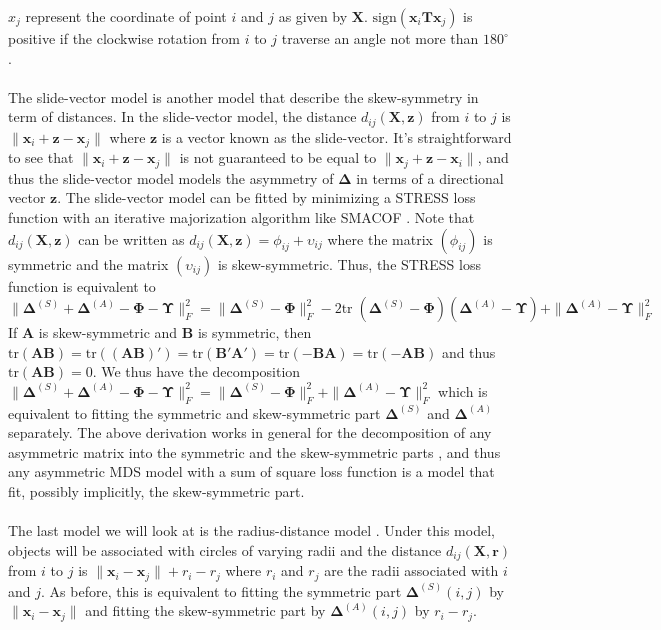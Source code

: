 \documentclass[11pt]{asaproc}
\begin{document}
$x_j$ represent the coordinate of point $i$ and $j$ as given by
$\mathbf{X}$. $\mathrm{sign}(\mathbf{x}_i \mathbf{T}
\mathbf{x}_j)$ is positive if the clockwise rotation from $i$ to $j$
traverse an angle not more than $180^\circ$. \\ \\
%
\noindent The slide-vector model is another model that describe the
skew-symmetry in term of distances. In the slide-vector model, the
distance $d_{ij}(\mathbf{X}, \mathbf{z})$ from $i$ to $j$ is 
$\| \mathbf{x}_i + \mathbf{z} - \mathbf{x}_j \|$ where $\mathbf{z}$
is a vector known as the slide-vector. It's straightforward to see that
$\| \mathbf{x}_i + \mathbf{z} - \mathbf{x}_j \|$ is not guaranteed to
be equal to $\| \mathbf{x}_j + \mathbf{z} - \mathbf{x}_i\|$, and thus
the slide-vector model models the asymmetry of $\bm{\Delta}$ in terms
of a directional vector $\mathbf{z}$. The slide-vector model can be
fitted by minimizing a STRESS loss function with an iterative
majorization algorithm like
SMACOF \citep{zielmand93:_analy}. Note that $d_{ij}(\mathbf{X},
\mathbf{z})$ can be written as $d_{ij}(\mathbf{X}, \mathbf{z}) =
\phi_{ij} + \upsilon_{ij}$ where the matrix $(\phi_{ij})$ is symmetric and
the matrix $(\upsilon_{ij})$ is skew-symmetric. Thus, the STRESS loss
function is equivalent to 
\begin{equation*}
\| \bm{\Delta}^{(S)} + \bm{\Delta}^{(A)} -
\bm{\Phi} - \bm{\Upsilon} \|^2_{F} = \| \bm{\Delta}^{(S)} -
\bm{\Phi}\|_{F}^{2} - 2 \mathrm{tr} \; (\bm{\Delta}^{(S)} - \bm{\Phi})
(\bm{\Delta}^{(A)} - \bm{\Upsilon}) + \| \bm{\Delta}^{(A)} -
\bm{\Upsilon} \|_{F}^{2}
\end{equation*}
If $\mathbf{A}$ is skew-symmetric and
$\mathbf{B}$ is symmetric, then $\mathrm{tr}(\mathbf{A}\mathbf{B}) =
\mathrm{tr}((\mathbf{A}\mathbf{B})') = \mathrm{tr}(\mathbf{B}'
\mathbf{A}') = \mathrm{tr}(- \mathbf{B} \mathbf{A}) = \mathrm{tr}(-
\mathbf{A} \mathbf{B})$ and thus $\mathrm{tr}(\mathbf{A}\mathbf{B}) =
0$. We thus have the decomposition $\| \bm{\Delta}^{(S)} + \bm{\Delta}^{(A)} -
\bm{\Phi} - \bm{\Upsilon} \|^2_{F} =  \| \bm{\Delta}^{(S)} -
\bm{\Phi}\|_{F}^{2} + \| \bm{\Delta}^{(A)} -
\bm{\Upsilon} \|_{F}^{2}$ which is equivalent to fitting the symmetric
and skew-symmetric part $\bm{\Delta}^{(S)}$ and $\bm{\Delta}^{(A)}$
separately. The above derivation works in general for the
decomposition of any asymmetric matrix into the symmetric and the
skew-symmetric parts
\citep{bove91:_metric}, and thus any asymmetric MDS model with a sum of
square loss function is a
model that fit, possibly implicitly, the skew-symmetric part.   
\\ \\ 
%
\noindent
The last model we will look at is the radius-distance model
\citep{okada87:_geomet}. Under this model, objects will be associated
with circles of varying radii and the distance $d_{ij}(\mathbf{X},
\mathbf{r})$ from $i$ to $j$ is $\|\mathbf{x}_i - \mathbf{x}_j\| + r_i
- r_j$ where $r_i$ and $r_j$ are the radii associated with $i$ and
$j$. As before, this is equivalent to fitting the symmetric part
$\bm{\Delta}^{(S)}(i,j)$ by $\|\mathbf{x}_i - \mathbf{x}_j\|$ and
fitting the skew-symmetric part by $\bm{\Delta}^{(A)}(i,j)$ by $r_i - r_j$.  
\end{document}
